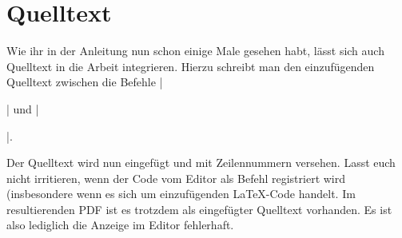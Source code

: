 
\chapter{Quelltext}

Wie ihr in der Anleitung nun schon einige Male gesehen habt, lässt sich auch Quelltext in die Arbeit integrieren. 
Hierzu schreibt man den einzufügenden Quelltext zwischen die Befehle  \befehl|\begin{listing}|  und \befehl|\end{listing}|.

Der Quelltext wird nun eingefügt und mit Zeilennummern versehen. 
Lasst euch nicht irritieren, wenn der Code vom Editor als Befehl registriert wird (insbesondere wenn es sich um einzufügenden \LaTeX -Code handelt.  
Im resultierenden PDF ist es trotzdem als eingefügter Quelltext vorhanden. 
Es ist also lediglich die Anzeige im Editor fehlerhaft.
